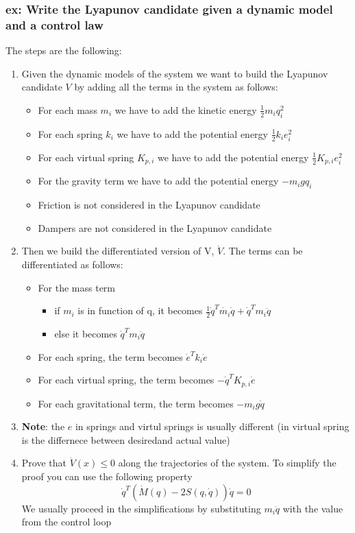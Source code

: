 \documentclass[a4paper,12pt]{article}
\begin{document}
\subsubsection{ex: Write the Lyapunov candidate given a dynamic model and a control law}
The steps are the following:
\begin{enumerate}
    \item Given the dynamic models of the system we want 
    to build the Lyapunov candidate $V$ by adding all the terms in the 
    system as follows:
    \begin{itemize} 
        \item For each mass $m_i$ we have to add the kinetic energy $\frac{1}{2}m_i q_i^2$
        \item For each spring $k_i$ we have to add the potential energy $\frac{1}{2}k_i e_i^2$
        \item For each virtual spring $K_{p,i}$ we have to add the potential energy $\frac{1}{2}K_{p,i} e_i^2$
        \item For the gravity term we have to add the potential energy $-m_i g q_i$
        \item Friction is not considered in the Lyapunov candidate
        \item Dampers are not considered in the Lyapunov candidate
    \end{itemize}
    \item Then we build the differentiated version of V, $\dot{V}$. The terms can be 
    differentiated as follows:
    \begin{itemize}
        \item For the mass term \begin{itemize}
            \item if $m_i$ is in function of q, it becomes $\frac{1}{2}\dot{q}^T\dot{m_i}\dot{q}+\dot{q}^Tm_i\ddot{q}$
            \item else it becomes $\dot{q}^Tm_i\ddot{q}$
        \end{itemize}
        \item For each spring, the term becomes $\dot{e}^Tk_i\dot{e}$
        \item For each virtual spring, the term becomes $-\dot{q}^TK_{p,i}\dot{e}$
        \item For each gravitational term, the term becomes $-m_i g \dot{q}$
    \end{itemize}
    \item \textbf{Note}: the $e$ in springs and virtul springs is usually different (in virtual spring
    is the differnece between desiredand actual value)
    \item Prove that $\dot{V}(x) \leq 0$ along the trajectories of the system. To simplify 
    the proof you can use the following property \begin{equation}
        \dot{q}^T(\dot{M}(q) - 2S(q,\dot{q}))\dot{q} = 0
    \end{equation} 
    We usually proceed in the simplifications by substituting $m_i \ddot{q}$ with
     the value from the control loop
     
\end{enumerate}
\end{document}
